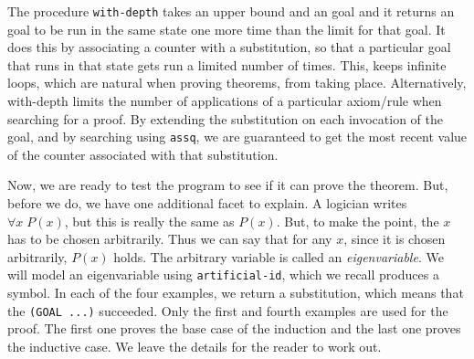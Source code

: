 The procedure \texttt{with-depth} takes an upper bound and an
goal and it returns an goal to be run in the same state
one more time than the limit for that goal.  It does this by
associating a counter with a substitution, so that a particular
goal that runs in that state gets run a limited number of times.
This, keeps infinite loops, which are natural when proving theorems,
from taking place.  Alternatively, with-depth limits the number of
applications of a particular axiom/rule when searching for a proof.
By extending the substitution on each invocation of the goal,
and by searching using \texttt{assq}, we are guaranteed to get the
most recent value of the counter associated with that substitution.

Now, we are ready to test the program to see if it can prove the
theorem.  But, before we do, we have one additional facet to explain.
A logician writes $\forall x \; P(x)$, but this is really the same as
$P(x)$.  But, to make the point, the $x$ has to be chosen arbitrarily.
Thus we can say that for any $x$, since it is chosen arbitrarily,
$P(x)$ holds.  The arbitrary variable is called an \emph{eigenvariable}.
We will model an eigenvariable using \texttt{artificial-id}, which we
recall produces a symbol.  In each of the four examples, we return a
substitution, which means that the \texttt{(GOAL ...)} succeeded.
Only the first and fourth examples are used for the proof.  The first
one proves the base case of the induction and the last one proves the
inductive case.  We leave the details for the reader to work out.


